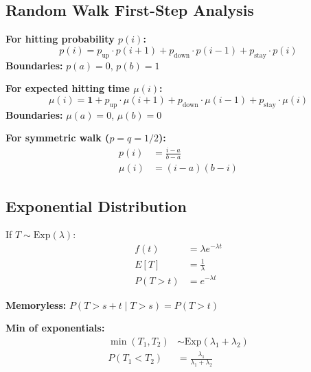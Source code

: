 \documentclass[11pt,letterpaper]{article}
\begin{document}
\subsection{Random Walk First-Step Analysis}

\begin{tcolorbox}[colback=blue!5,colframe=blue!70,title=First-Step Analysis Formulas]
\textbf{For hitting probability $p(i)$:}
\[
p(i) = p_{\text{up}} \cdot p(i+1) + p_{\text{down}} \cdot p(i-1) + p_{\text{stay}} \cdot p(i)
\]
\textbf{Boundaries:} $p(a) = 0$, $p(b) = 1$

\vspace{0.3cm}

\textbf{For expected hitting time $\mu(i)$:}
\[
\mu(i) = \mathbf{1} + p_{\text{up}} \cdot \mu(i+1) + p_{\text{down}} \cdot \mu(i-1) + p_{\text{stay}} \cdot \mu(i)
\]
\textbf{Boundaries:} $\mu(a) = 0$, $\mu(b) = 0$

\vspace{0.3cm}

\textbf{For symmetric walk ($p = q = 1/2$):}
\begin{align*}
p(i) &= \frac{i - a}{b - a} \\
\mu(i) &= (i - a)(b - i)
\end{align*}
\end{tcolorbox}

\subsection{Exponential Distribution}

\begin{tcolorbox}[colback=blue!5,colframe=blue!70,title=Exponential Distribution Formulas]
If $T \sim \text{Exp}(\lambda)$:
\begin{align*}
f(t) &= \lambda e^{-\lambda t} \\
E[T] &= \frac{1}{\lambda} \\
P(T > t) &= e^{-\lambda t}
\end{align*}

\textbf{Memoryless:} $P(T > s+t \mid T > s) = P(T > t)$

\vspace{0.3cm}

\textbf{Min of exponentials:}
\begin{align*}
\min(T_1, T_2) &\sim \text{Exp}(\lambda_1 + \lambda_2) \\
P(T_1 < T_2) &= \frac{\lambda_1}{\lambda_1 + \lambda_2}
\end{align*}
\end{tcolorbox}
\end{document}
